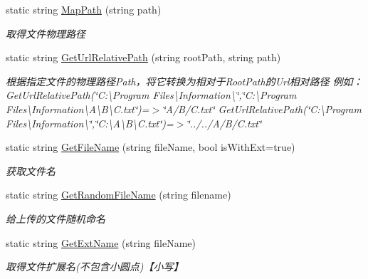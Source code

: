 \begin{DoxyCompactItemize}
static string \hyperlink{class_x_c_l_net_tools_1_1_file_handler_1_1_com_file_a98d090828121f63039a22838b065dfaa}{Map\+Path} (string path)
\begin{DoxyCompactList}\small\item\em 取得文件物理路径 \end{DoxyCompactList}\item 
static string \hyperlink{class_x_c_l_net_tools_1_1_file_handler_1_1_com_file_a87d1f27fa942e4682abc91f13ca79672}{Get\+Url\+Relative\+Path} (string root\+Path, string path)
\begin{DoxyCompactList}\small\item\em 根据指定文件的物理路径\+Path，将它转换为相对于\+Root\+Path的\+Url相对路径 例如： Get\+Url\+Relative\+Path(\char`\"{}\+C\+:\textbackslash{}\+Program Files\textbackslash{}\+Information\textbackslash{}\char`\"{},\char`\"{}\+C\+:\textbackslash{}\+Program Files\textbackslash{}\+Information\textbackslash{}\+A\textbackslash{}\+B\textbackslash{}\+C.\+txt\char`\"{})=$>$\char`\"{}\+A/\+B/\+C.\+txt\char`\"{} Get\+Url\+Relative\+Path(\char`\"{}\+C\+:\textbackslash{}\+Program Files\textbackslash{}\+Information\textbackslash{}\char`\"{},\char`\"{}\+C\+:\textbackslash{}\+A\textbackslash{}\+B\textbackslash{}\+C.\+txt\char`\"{})=$>$\char`\"{}../../\+A/\+B/\+C.\+txt\char`\"{} \end{DoxyCompactList}\item 
static string \hyperlink{class_x_c_l_net_tools_1_1_file_handler_1_1_com_file_ad13584770f8b195682bbaccf49d9f10d}{Get\+File\+Name} (string file\+Name, bool is\+With\+Ext=true)
\begin{DoxyCompactList}\small\item\em 获取文件名 \end{DoxyCompactList}\item 
static string \hyperlink{class_x_c_l_net_tools_1_1_file_handler_1_1_com_file_acc1c32c42fbd8c6e76f3a609af5e407f}{Get\+Random\+File\+Name} (string filename)
\begin{DoxyCompactList}\small\item\em 给上传的文件随机命名 \end{DoxyCompactList}\item 
static string \hyperlink{class_x_c_l_net_tools_1_1_file_handler_1_1_com_file_ab93269a3eef81ae3afe9e502e202f209}{Get\+Ext\+Name} (string file\+Name)
\begin{DoxyCompactList}\small\item\em 取得文件扩展名(不包含小圆点)【小写】 \end{DoxyCompactList}\end{DoxyCompactItemize}


